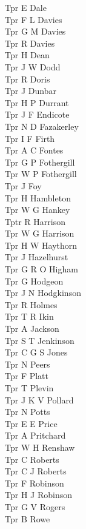 \begin{multicols}{2}
  Tpr E Dale \\
  Tpr F L Davies \\
  Tpr G M Davies \\
  Tpr R Davies \\
  Tpr H Dean \\
  Tpr J W Dodd \\
  Tpr R Doris \\
  Tpr J Dunbar \\
  Tpr H P Durrant \\
  Tpr J F Endicote \\
  Tpr N D Fazakerley \\
  Tpr I F Firth \\
  Tpr A C Fontes \\
  Tpr G P Fothergill \\
  Tpr W P Fothergill \\
  Tpr J Foy \\
  Tpr H Hambleton \\
  Tpr W G Hankey \\
  Tptr R Harrison \\
  Tpr W G Harrison \\
  Tpr H W Haythorn \\
  Tpr J Hazelhurst \\
  Tpr G R O Higham \\
  Tpr G Hodgeon \\
  Tpr J N Hodgkinson \\
  Tpr R Holmes \\
  Tpr T R Ikin \\
  Tpr A Jackson \\
  Tpr S T Jenkinson \\
  Tpr C G S Jones \\
  Tpr N Peers \\
  Tpr F Platt \\
  Tpr T Plevin \\
  Tpr J K V Pollard \\
  Tpr N Potts \\
  Tpr E E Price \\
  Tpr A Pritchard \\
  Tpr W H Renshaw \\
  Tpr C Roberts \\
  Tpr C J Roberts \\
  Tpr F Robinson \\
  Tpr H J Robinson \\
  Tpr G V Rogers \\
  Tpr B Rowe \\

\end{multicols}
